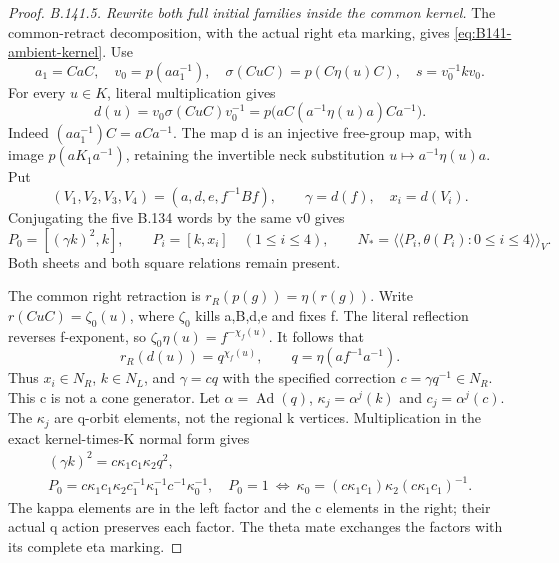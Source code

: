 \begin{proof}
\emph{B.141.5. Rewrite both full initial families inside the common kernel.}
The common-retract decomposition, with the actual right eta marking,
gives \eqref{eq:B141-ambient-kernel}. Use
\[
a_1=CaC,\quad v_0=p(aa_1^{-1}),\quad
\sigma(CuC)=p(C\eta(u)C),\quad s=v_0^{-1}kv_0.
\]
For every $u\in K$, literal multiplication gives
\begin{equation}\label{eq:B141-d-map}
d(u)=v_0\sigma(CuC)v_0^{-1}
    =p\bigl(aC(a^{-1}\eta(u)a)Ca^{-1}\bigr).
\end{equation}
Indeed $(aa_1^{-1})C=aCa^{-1}$. The map d is an injective
free-group map, with image $p(aK_1a^{-1})$, retaining the
invertible neck substitution $u\mapsto a^{-1}\eta(u)a$.
Put
\[
(V_1,V_2,V_3,V_4)=(a,d,e,f^{-1}Bf),\qquad
\gamma=d(f),\quad x_i=d(V_i).
\]
Conjugating the five B.134 words by the same v0 gives
\begin{equation}\label{eq:B141-mixed-family}
P_0=[(\gamma k)^2,k],\qquad P_i=[k,x_i]\quad(1\le i\le4),
\qquad
N_*=\langle\!\langle P_i,\theta(P_i):0\le i\le4\rangle\!\rangle_V.
\end{equation}
Both sheets and both square relations remain present.

The common right retraction is $r_R(p(g))=\eta(r(g))$.
Write $r(CuC)=\zeta_0(u)$, where $\zeta_0$ kills a,B,d,e
and fixes f. The literal reflection reverses f-exponent, so
$\zeta_0\eta(u)=f^{-\chi_f(u)}$. It follows that
\begin{equation}\label{eq:B141-heads}
r_R(d(u))=q^{\chi_f(u)},\qquad
q=\eta(af^{-1}a^{-1}).
\end{equation}
Thus $x_i\in N_R$, $k\in N_L$, and $\gamma=cq$ with the
specified correction $c=\gamma q^{-1}\in N_R$.
This c is not a cone generator. Let
$\alpha=\operatorname{Ad}(q)$,
$\kappa_j=\alpha^j(k)$ and $c_j=\alpha^j(c)$.
The $\kappa_j$ are q-orbit elements, not the regional k vertices.
Multiplication in the exact kernel-times-K normal form gives
\begin{equation}\label{eq:B141-recurrence}
\begin{gathered}
(\gamma k)^2=c\kappa_1c_1\kappa_2q^2,\\
P_0=c\kappa_1c_1\kappa_2c_1^{-1}\kappa_1^{-1}c^{-1}\kappa_0^{-1},
\quad
P_0=1\ \Longleftrightarrow\
\kappa_0=(c\kappa_1c_1)\kappa_2(c\kappa_1c_1)^{-1}.
\end{gathered}
\end{equation}
The kappa elements are in the left factor and the c elements in
the right; their actual q action preserves each factor. The theta
mate exchanges the factors with its complete eta marking.


\end{proof}
